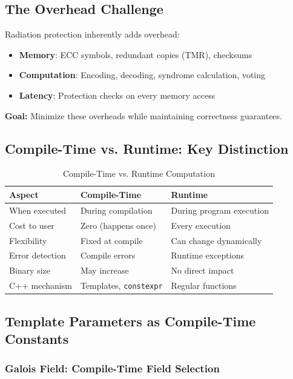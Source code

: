 \documentclass[11pt,a4paper]{article}
\begin{document}
\subsection{The Overhead Challenge}

Radiation protection inherently adds overhead:
\begin{itemize}
    \item \textbf{Memory}: ECC symbols, redundant copies (TMR), checksums
    \item \textbf{Computation}: Encoding, decoding, syndrome calculation, voting
    \item \textbf{Latency}: Protection checks on every memory access
\end{itemize}

\textbf{Goal:} Minimize these overheads while maintaining correctness guarantees.

\subsection{Compile-Time vs. Runtime: Key Distinction}

\begin{table}[htbp]
\centering
\caption{Compile-Time vs. Runtime Computation}
\begin{tabular}{@{}lll@{}}
\toprule
\textbf{Aspect} & \textbf{Compile-Time} & \textbf{Runtime} \\ \midrule
When executed & During compilation & During program execution \\
Cost to user & Zero (happens once) & Every execution \\
Flexibility & Fixed at compile & Can change dynamically \\
Error detection & Compile errors & Runtime exceptions \\
Binary size & May increase & No direct impact \\
C++ mechanism & Templates, \texttt{constexpr} & Regular functions \\
\bottomrule
\end{tabular}
\end{table}

\subsection{Template Parameters as Compile-Time Constants}

\subsubsection{Galois Field: Compile-Time Field Selection}
\end{document}
